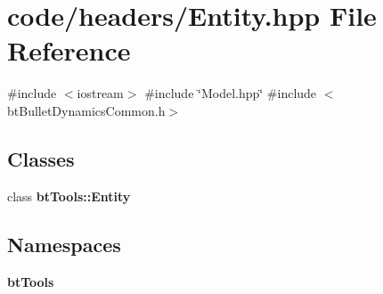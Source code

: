\section{code/headers/\+Entity.hpp File Reference}
\label{_entity_8hpp}
{\ttfamily \#include $<$iostream$>$}\newline
{\ttfamily \#include \char`\"{}Model.\+hpp\char`\"{}}\newline
{\ttfamily \#include $<$bt\+Bullet\+Dynamics\+Common.\+h$>$}\newline
\subsection*{Classes}
\begin{DoxyCompactItemize}
\item 
class \textbf{ bt\+Tools\+::\+Entity}
\end{DoxyCompactItemize}
\subsection*{Namespaces}
\begin{DoxyCompactItemize}
\item 
 \textbf{ bt\+Tools}
\end{DoxyCompactItemize}
